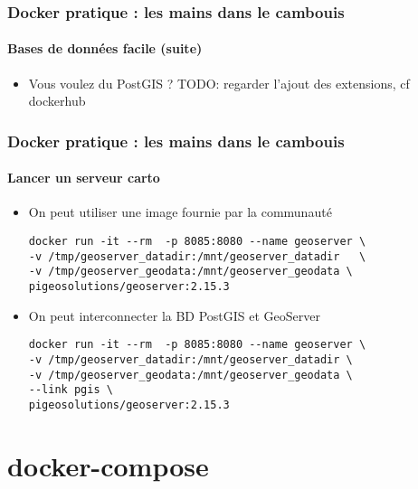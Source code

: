 \documentclass[11pt]{beamer}
\begin{document}
\begin{frame}[fragile]
\frametitle{Docker pratique : les mains dans le cambouis }
\framesubtitle{Bases de données facile (suite)}
\begin{itemize}
	\item Vous voulez du PostGIS ?
	TODO: regarder l'ajout des extensions, cf dockerhub
\end{itemize}
\end{frame}

\begin{frame}[fragile]
\frametitle{Docker pratique : les mains dans le cambouis }
\framesubtitle{Lancer un serveur carto}
\begin{itemize}
	\item On peut utiliser une image fournie par la communauté
	\begin{lstlisting}
docker run -it --rm  -p 8085:8080 --name geoserver \
-v /tmp/geoserver_datadir:/mnt/geoserver_datadir   \
-v /tmp/geoserver_geodata:/mnt/geoserver_geodata \
pigeosolutions/geoserver:2.15.3
	\end{lstlisting}
	\item On peut interconnecter la BD PostGIS  et GeoServer
	\begin{lstlisting}
docker run -it --rm  -p 8085:8080 --name geoserver \
-v /tmp/geoserver_datadir:/mnt/geoserver_datadir \
-v /tmp/geoserver_geodata:/mnt/geoserver_geodata \
--link pgis \
pigeosolutions/geoserver:2.15.3
	\end{lstlisting}
\end{itemize}
\end{frame}

\section{docker-compose}
\end{document}
